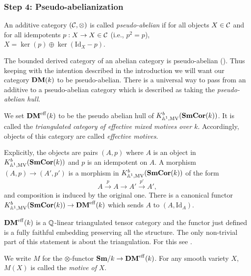\subsubsection{Step 4: Pseudo-abelianization}
\begin{defn}
  An additive category $(\mathcal{C}, \otimes)$ is called
  \emph{pseudo-abelian} if for all objects $X \in \mathcal{C}$ and for all
  idempotents $p : X \to X \in \mathcal{C}$ (i.e., $p^2 = p$), $X = \ker(p)
  \oplus \ker(\mathrm{Id}_{X} - p)$.
\end{defn}
\begin{rem}
  The bounded derived category of an abelian category is
  pseudo-abelian (\cite[2.8]{Balmer-Schlichting}). Thus keeping with
  the intention described in the introduction we will want our
  category $\mathbf{DM}(k)$ to be pseudo-abelian. There is a universal way to
  pass from an additive to a pseudo-abelian category which is
  described as taking the \emph{pseudo-abelian hull}.
\end{rem}
\begin{defn}
  We set $\mathbf{DM}^{\mathrm{eff}}(k)$ to be the pseudo abelian hull of
  $K^b_{\mathbb{A}^1,\mathrm{MV}}(\mathbf{SmCor}(k))$. It is called the
  \emph{triangulated category of effective mixed motives over
    $k$}. Accordingly, objects of this category are called
  \emph{effective motives}.
\end{defn}
Explicitly, the objects are pairs $(A,p)$ where $A$ is an object in
$K^b_{\mathbb{A}^1,\mathrm{MV}}(\mathbf{SmCor}(k))$ and $p$ is an idempotent on $A$. A
morphism $(A,p)\to (A',p')$ is a morphism in
$K^b_{\mathbb{A}^1,\mathrm{MV}}(\mathbf{SmCor}(k))$ of the form
\begin{equation*}
  A\stackrel{p}{\to}A\to A'\stackrel{p'}{\to}A',
\end{equation*}
and composition is induced by the original one. There is a canonical
functor $K^b_{\mathbb{A}^1,\mathrm{MV}}(\mathbf{SmCor}(k))\to \mathbf{DM}^{\mathrm{eff}}(k)$
which sends $A$ to $(A,\mathrm{Id}_{A})$.
\begin{rem}
  $\mathbf{DM}^{\mathrm{eff}}(k)$ is a $\mathbb{Q}$-linear triangulated tensor
  category and the functor just defined is a fully faithful embedding
  preserving all the structure. The only non-trivial part of this
  statement is about the triangulation. For this see
  \cite[1.5]{Balmer-Schlichting}.
\end{rem}
\begin{defn}
  We write $M$ for the $\otimes$-functor
  $\mathbf{Sm}/k\to\mathbf{DM}^{\mathrm{eff}}(k)$. For any smooth variety $X$, $M(X)$
  is called the \emph{motive of} $X$.
\end{defn}
